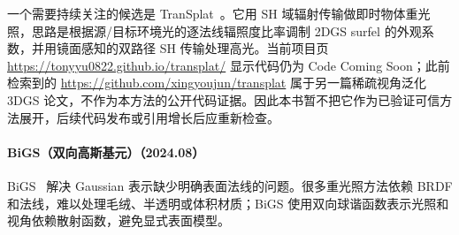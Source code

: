 一个需要持续关注的候选是 TranSplat~\cite{2503_22676}。它用 SH 域辐射传输做即时物体重光照，思路是根据源/目标环境光的逐法线辐照度比率调制 2DGS surfel 的外观系数，并用镜面感知的双路径 SH 传输处理高光。当前项目页 \url{https://tonyyu0822.github.io/transplat/} 显示代码仍为 Code Coming Soon；此前检索到的 \url{https://github.com/xingyoujun/transplat} 属于另一篇稀疏视角泛化 3DGS 论文，不作为本方法的公开代码证据。因此本书暂不把它作为已验证可信方法展开，后续代码发布或引用增长后应重新检查。



\paragraph{BiGS（双向高斯基元）（2024.08）}
BiGS~\cite{2408_13370} 解决 Gaussian 表示缺少明确表面法线的问题。很多重光照方法依赖 BRDF 和法线，难以处理毛绒、半透明或体积材质；BiGS 使用双向球谐函数表示光照和视角依赖散射函数，避免显式表面模型。

